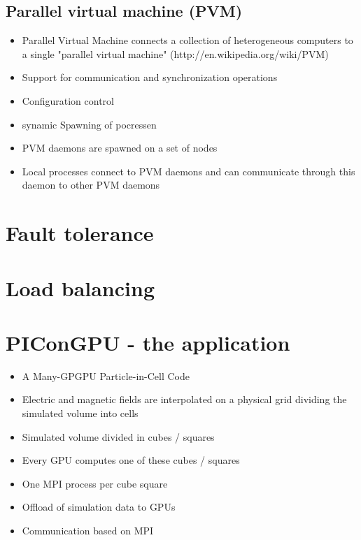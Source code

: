 \subsection{Parallel virtual machine (PVM)}
\label{sec:pvm}
\begin{itemize}
\item Parallel Virtual Machine connects a collection of heterogeneous computers
  to a single "parallel virtual machine"
  (http://en.wikipedia.org/wiki/PVM)
\item Support for communication and synchronization operations
\item Configuration control
\item synamic Spawning of pocressen
\item PVM daemons are spawned on a set of nodes
\item Local processes connect to PVM daemons and can 
  communicate through this daemon to other PVM daemons
\end{itemize}

\section{Fault tolerance}
\section{Load balancing}

\section{PIConGPU - the application}
\label{sec:picongpu}
\begin{itemize}
  \item A Many-GPGPU Particle-in-Cell Code
  \item Electric and magnetic fields are interpolated on a physical
    grid dividing the simulated volume into cells
  \item Simulated volume divided in cubes / squares
  \item Every GPU computes one of these cubes / squares
  \item One MPI process per cube square
  \item Offload of simulation data to GPUs
  \item Communication based on MPI
\end{itemize}


